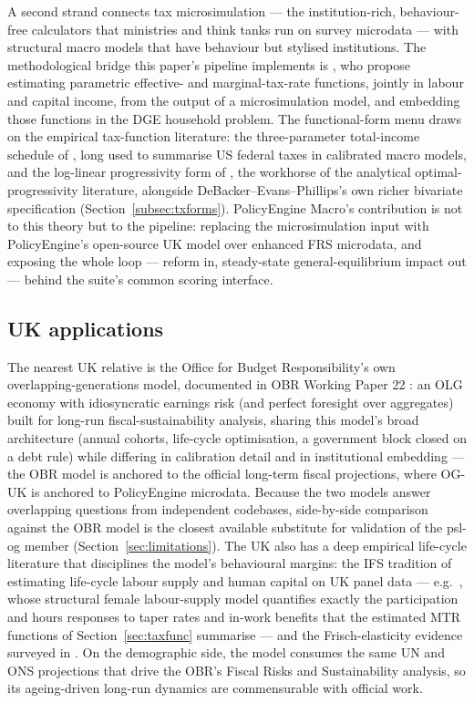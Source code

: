 A second strand connects tax microsimulation --- the institution-rich, behaviour-free calculators that ministries and think tanks run on survey microdata --- with structural macro models that have behaviour but stylised institutions. The methodological bridge this paper's pipeline implements is \citet{DeBackerEvansPhillips2019}, who propose estimating parametric effective- and marginal-tax-rate functions, jointly in labour and capital income, from the output of a microsimulation model, and embedding those functions in the DGE household problem. The functional-form menu draws on the empirical tax-function literature: the three-parameter total-income schedule of \citet{GouveiaStrauss1994}, long used to summarise US federal taxes in calibrated macro models, and the log-linear progressivity form of \citet{HSV2017}, the workhorse of the analytical optimal-progressivity literature, alongside DeBacker--Evans--Phillips's own richer bivariate specification (Section~\ref{subsec:txforms}). PolicyEngine Macro's contribution is not to this theory but to the pipeline: replacing the microsimulation input with PolicyEngine's open-source UK model over enhanced FRS microdata, and exposing the whole loop --- reform in, steady-state general-equilibrium impact out --- behind the suite's common scoring interface.

\subsection{UK applications}
\label{subsec:uklit}

The nearest UK relative is the Office for Budget Responsibility's own overlapping-generations model, documented in OBR Working Paper 22 \citep{OBR2025OLG}: an OLG economy with idiosyncratic earnings risk (and perfect foresight over aggregates) built for long-run fiscal-sustainability analysis, sharing this model's broad architecture (annual cohorts, life-cycle optimisation, a government block closed on a debt rule) while differing in calibration detail and in institutional embedding --- the OBR model is anchored to the official long-term fiscal projections, where OG-UK is anchored to PolicyEngine microdata. Because the two models answer overlapping questions from independent codebases, side-by-side comparison against the OBR model is the closest available substitute for validation of the psl-og member (Section~\ref{sec:limitations}). The UK also has a deep empirical life-cycle literature that disciplines the model's behavioural margins: the IFS tradition of estimating life-cycle labour supply and human capital on UK panel data --- e.g.\ \citet{BlundellDiasMeghirShaw2016}, whose structural female labour-supply model quantifies exactly the participation and hours responses to taper rates and in-work benefits that the estimated MTR functions of Section~\ref{sec:taxfunc} summarise --- and the Frisch-elasticity evidence surveyed in \citet{BlundellMaCurdyMeghir2007}. On the demographic side, the model consumes the same UN and ONS projections \citep{UNWPP2024,ONSNA} that drive the OBR's Fiscal Risks and Sustainability analysis, so its ageing-driven long-run dynamics are commensurable with official work.

